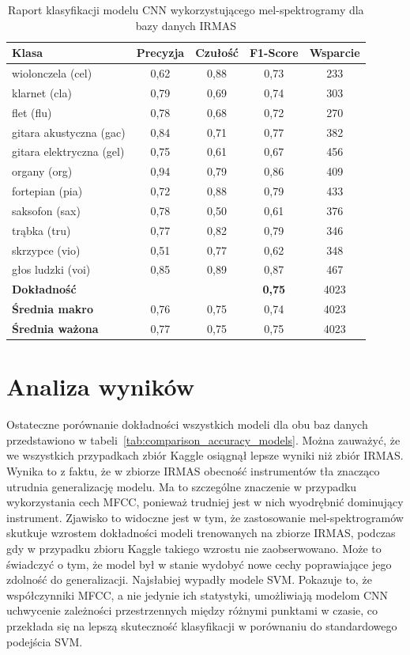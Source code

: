 \documentclass{SGGW-thesis}
\begin{document}
\begin{table}[H]
\centering
\caption{Raport klasyfikacji modelu CNN wykorzystującego mel-spektrogramy dla bazy danych IRMAS}
\label{tab:cnn_melspectrogram_IRMAS}
\begin{tabular}{lcccc}
\toprule
\textbf{Klasa} & \textbf{Precyzja} & \textbf{Czułość} & \textbf{F1-Score} & \textbf{Wsparcie} \\
\midrule
wiolonczela (cel) & 0,62 & 0,88 & 0,73 & 233 \\
klarnet (cla) & 0,79 & 0,69 & 0,74 & 303 \\
flet (flu) & 0,78 & 0,68 & 0,72 & 270 \\
gitara akustyczna (gac) & 0,84 & 0,71 & 0,77 & 382 \\
gitara elektryczna (gel) & 0,75 & 0,61 & 0,67 & 456 \\
organy (org) & 0,94 & 0,79 & 0,86 & 409 \\
fortepian (pia) & 0,72 & 0,88 & 0,79 & 433 \\
saksofon (sax) & 0,78 & 0,50 & 0,61 & 376 \\
trąbka (tru) & 0,77 & 0,82 & 0,79 & 346 \\
skrzypce (vio) & 0,51 & 0,77 & 0,62 & 348 \\
głos ludzki (voi) & 0,85 & 0,89 & 0,87 & 467 \\
\midrule
\textbf{Dokładność} & & & \textbf{0,75} & 4023 \\
\textbf{Średnia makro} & 0,76 & 0,75 & 0,74 & 4023 \\
\textbf{Średnia ważona} & 0,77 & 0,75 & 0,75 & 4023 \\
\bottomrule
\end{tabular}
\end{table}

\section{Analiza wyników}
Ostateczne porównanie dokładności wszystkich modeli dla obu baz danych przedstawiono w tabeli~\ref{tab:comparison_accuracy_models}. Można zauważyć, że we wszystkich przypadkach zbiór Kaggle osiągnął lepsze wyniki niż zbiór IRMAS. Wynika to z faktu, że w zbiorze IRMAS obecność instrumentów tła znacząco utrudnia generalizację modelu. Ma to szczególne znaczenie w przypadku wykorzystania cech MFCC, ponieważ trudniej jest w nich wyodrębnić dominujący instrument. Zjawisko to widoczne jest w tym, że zastosowanie mel-spektrogramów skutkuje wzrostem dokładności modeli trenowanych na zbiorze IRMAS, podczas gdy w przypadku zbioru Kaggle takiego wzrostu nie zaobserwowano. Może to świadczyć o tym, że model był w stanie wydobyć nowe cechy poprawiające jego zdolność do generalizacji. Najsłabiej wypadły modele SVM. Pokazuje to, że współczynniki MFCC, a nie jedynie ich statystyki, umożliwiają modelom CNN uchwycenie zależności przestrzennych między różnymi punktami w czasie, co przekłada się na lepszą skuteczność klasyfikacji w porównaniu do standardowego podejścia SVM.
\end{document}
